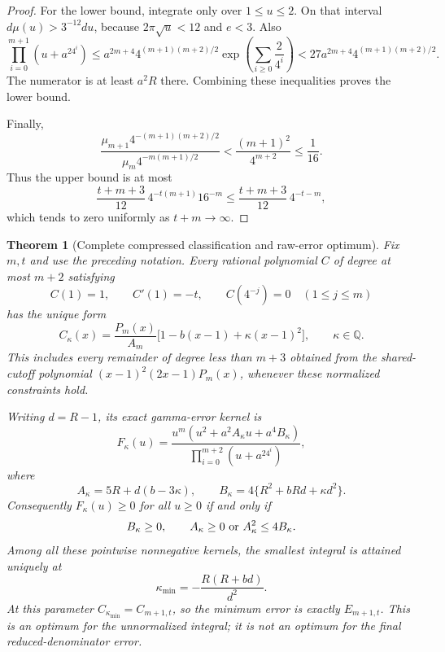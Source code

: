 \documentclass[11pt,a4paper]{article}
\newtheorem{theorem}{Theorem}[section]
\theoremstyle{definition}
\theoremstyle{remark}
\begin{document}
\begin{proof}
For the lower bound, integrate only over $1\le u\le2$.
On that interval $d\mu(u)>3^{-12}du$, because
$2\pi\sqrt u<12$ and $e<3$. Also
\[
 \prod_{i=0}^{m+1}(u+a^24^i)
 \le a^{2m+4}4^{(m+1)(m+2)/2}
      \exp\!\left(\sum_{i\ge0}\frac2{4^i}\right)
 <27a^{2m+4}4^{(m+1)(m+2)/2}.
\]
The numerator is at least $a^2R$ there. Combining these inequalities
proves the lower bound.

Finally,
\[
 \frac{\mu_{m+1}4^{-(m+1)(m+2)/2}}
      {\mu_m4^{-m(m+1)/2}}
 <\frac{(m+1)^2}{4^{m+2}}\le\frac1{16}.
\]
Thus the upper bound is at most
\[
 \frac{t+m+3}{12}\,4^{-t(m+1)}16^{-m}
 \le\frac{t+m+3}{12}\,4^{-t-m},
\]
which tends to zero uniformly as $t+m\to\infty$.
\end{proof}

\begin{theorem}[Complete compressed classification and raw-error optimum]
\label{next-cutoff-classification}
Fix $m,t$ and use the preceding notation. Every rational polynomial $C$
of degree at most $m+2$ satisfying
\[
 C(1)=1,\qquad C'(1)=-t,\qquad
 C(4^{-j})=0\quad(1\le j\le m)
\]
has the unique form
\[
 C_\kappa(x)=\frac{P_m(x)}{A_m}
       \bigl[1-b(x-1)+\kappa(x-1)^2\bigr],
 \qquad \kappa\in\mathbb Q.
\]
This includes every remainder of degree less than $m+3$ obtained from
the shared-cutoff polynomial
$(x-1)^2(2x-1)P_m(x)$, whenever these normalized constraints hold.

Writing $d=R-1$, its exact gamma-error kernel is
\[
 F_\kappa(u)=
 \frac{u^m(u^2+a^2A_\kappa u+a^4B_\kappa)}
      {\prod_{i=0}^{m+2}(u+a^24^i)},
\]
where
\[
 A_\kappa=5R+d(b-3\kappa),\qquad
 B_\kappa=4\{R^2+bRd+\kappa d^2\}.
\]
Consequently $F_\kappa(u)\ge0$ for all $u\ge0$ if and only if
\begin{equation}\label{next-cutoff-quadratic-positivity}
 B_\kappa\ge0,\qquad
 A_\kappa\ge0\ \hbox{or}\ A_\kappa^2\le4B_\kappa.
\end{equation}
Among all these pointwise nonnegative kernels, the smallest integral is
attained uniquely at
\[
 \kappa_{\min}=-\frac{R(R+bd)}{d^2}.
\]
At this parameter $C_{\kappa_{\min}}=C_{m+1,t}$, so the minimum error is
exactly $E_{m+1,t}$. This is an optimum for the unnormalized integral;
it is not an optimum for the final reduced-denominator error.
\end{theorem}
\end{document}
